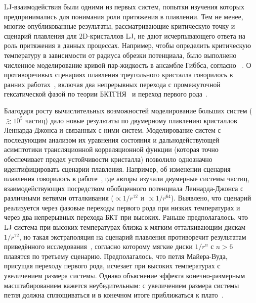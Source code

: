 LJ-взаимодействия были одними из первых систем, попытки изучения которых предпринимались для понимания роли притяжения в плавлении. 
Тем не менее, многие опубликованные результаты, рассматривающие критическую точку и сценарий плавления для 2D-кристаллов LJ, не дают исчерпывающего ответа на роль притяжения в данных процессах.
Например, чтобы определить критическую температуру в зависимости от радиуса обрезки потенциала, было выполнено численное моделирование кривой пар-жидкость в ансамбле Гиббса, согласно ~\cite{10.1063/1.460477}.
О противоречивых сценариях плавления треугольного кристалла говорилось в ранних работах~\cite{10.1103/physrevlett.42.1632, 10.1063/1.436526, 10.1103/physrevlett.44.463, 10.1063/1.441901, 10.1103/physrevlett.52.449, 10.1103/physrevb.30.2755}, включая два непрерывных перехода с промежуточной гексатической фазой по теории БКТГНЯ~\cite{10.1103/physrevlett.42.1632} и переход первого рода~\cite{10.1063/1.436526, 10.1103/physrevlett.44.463, 10.1063/1.441901, 10.1103/physrevlett.52.449}.

Благодаря росту вычислительных возможностей моделирование больших систем ($\gtrsim 10^5$ частиц) дало новые результаты по двумерному плавлению кристаллов Леннарда-Джонса и связанных с ними систем.
Моделирование систем с последующим анализом их уравнения состояния и дальнодействующей асимптотики трансляционной корреляционной функции (которая точно обеспечивает предел устойчивости кристалла) позволило однозначно идентифицировать сценарии плавления. 
Например, об изменении сценария плавления говорилось в работе~\cite{10.1103/physreve.99.022145}, где авторы изучали двумерные системы частиц, взаимодействующих посредством обобщенного потенциала Леннарда-Джонса с различными ветвями отталкивания ($\propto 1/r ^{12}$ и $\propto 1/r^{64}$).
Выявлено, что сценарий реализуется через фазовые переходы первого рода при низких температурах и через два непрерывных перехода БКТ при высоких.
Раньше предполагалось, что LJ-система при высоких температурах близка к мягким отталкивающим дискам $1/r^{12}$, но такая экстраполяция на сценарий плавления противоречит результатам приведённого исследования~\cite{10.1103/physrevlett.114.035702}, согласно которому мягкие диски $1/r^n$ с $n>6$ плавятся по третьему сценарию.
Предполагалось, что петля Майера-Вуда, присущая переходу первого рода, исчезает при высоких температурах с увеличением размера системы. 
Однако объяснение эффекта конечно-размерным масштабированием кажется неубедительным: с увеличением размера системы петля должна сплющиваться и в конечном итоге приближаться к плато~\cite{10.1103/physreve.87.042134, 10.1103/physreve.59.2659}.


